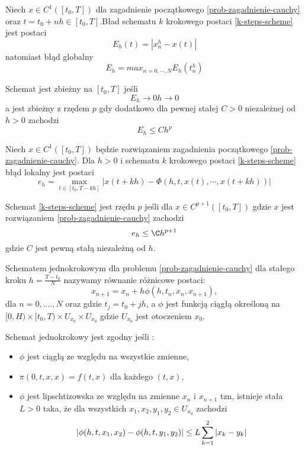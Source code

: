 \documentclass[12pt,a4paper]{report}
\begin{document}
\begin{definition}  
Niech $ x \in C^{1}([t_0,T])$ dla zagadnienie początkowego \ref{prob-zagadnienie-cauchy} oraz $t=t_0 +nh \in [t_0,T]$.Bład schematu $k$ krokowego postaci \ref{k-steps-scheme} jest postaci 
$$
E_h(t) = |x^{h}_{n} - x(t)|
$$ 
natomiast błąd globalny 
$$
E_h = max_{n=0,\cdots,N} E_h(t^{h}_{n})
$$
\end{definition}
\begin{definition}
Schemat jest zbieżny na $[t_0,T]$ jeśli 
$$
E_h \to 0  h \to 0
$$
a jest zbieżny z rzędem $p$ gdy dodatkowo dla pewnej stałej $C>0$ niezależnej od $h>0$ zachodzi 
$$
E_h \leq C h^p
$$
\end{definition}
\begin{definition}
Niech $x \in C^1([t_0,T]) $ będzie rozwiązaniem zagadnienia początkowego \ref{prob-zagadnienie-cauchy}. Dla $h>0$ i schematu $k$ krokowego postaci \ref{k-steps-scheme} błąd lokalny jest postaci
\begin{equation}
e_h = \max_{t \in [t_0,T-kh]} |x(t + kh) - \Phi (h,t,x(t),\cdots, x(t + kh))|
\end{equation}
\end{definition}
\begin{definition} 
Schemat \ref{k-steps-scheme} jest rzędu $p$ jeśli dla $x \in C^{p+1}([t_0,T])$ gdzie $x$ jest rozwiązaniem \ref{prob-zagadnienie-cauchy} zachodzi
$$
e_h \leq \C h^{p+1}
$$
gdzie $C$ jest pewną stałą niezależną od $h$. 
\end{definition}
\begin{definition}  
Schematem jednokrokowym dla problemu \ref{prob-zagadnienie-cauchy} dla stałego kroku $h = \frac{T-t_0}{N}$ nazywamy równanie różnicowe postaci:
$$
x_{n+1} = x_n + h \phi(h,t_{n},x_{n},x_{n+1}),  
$$
dla $n = 0,....,N$ oraz gdzie $t_{j} = t_{0} + jh$, a $\phi$ jest funkcją ciągłą określoną na $[0,H) \times [t_0,T) \times U_{x_0} \times U_{x_0} $ gdzie $ U_{x_0} $ jest otoczeniem $x_0$.   
\end{definition}
 
\begin{definition}\label{definition-consistency}
Schemat jednokrokowy jest zgodny jeśli :
\begin{itemize}
\item $\phi$ jest ciągłą ze względu na wszystkie zmienne,
\item $\pi(0,t,x,x) = f(t,x)$ dla każdego $(t,x)$,
\item $\phi$ jest lipschtizowska ze względu na zmienne $x_n$ i $x_{n+1}$ tzn, istnieje stała $L>0$ taka, że dla wszystkich $x_1,x_2,y_1,y_2 \in U_{x_0}$ zachodzi
$$
\abs{\phi(h,t,x_1,x_2) - \phi(h,t,y_1,y_2)} \leq L  \sum_{k=1}^{2} \abs{x_k - y_k}
$$
\end{itemize}

\end{definition}
\end{document}
